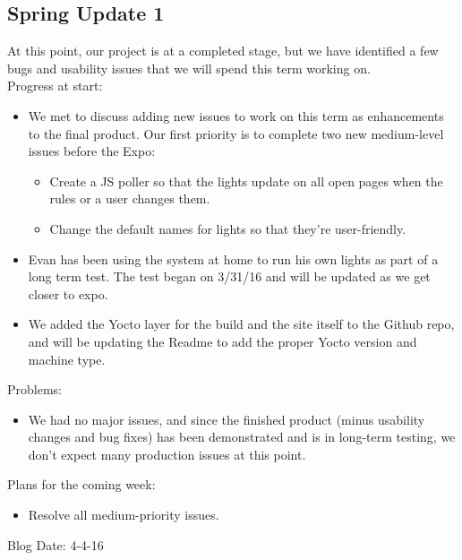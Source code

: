 \subsection{Spring Update 1}
At this point, our project is at a completed stage, but we have identified a few bugs and usability issues that we will spend this term working on.\\
Progress at start:
\begin{itemize}
\item We met to discuss adding new issues to work on this term as enhancements to the final product. Our first priority is to complete two new medium-level issues before the Expo:
\begin{itemize}
\item Create a JS poller so that the lights update on all open pages when the rules or a user changes them.
\item Change the default names for lights so that they're user-friendly.
\end{itemize}
\item Evan has been using the system at home to run his own lights as part of a long term test. The test began on 3/31/16 and will be updated as we get closer to expo.
\item We added the Yocto layer for the build and the site itself to the Github repo, and will be updating the Readme to add the proper Yocto version and machine type.
\end{itemize}
Problems:
\begin{itemize}
\item We had no major issues, and since the finished product (minus usability changes and bug fixes) has been demonstrated and is in long-term testing, we don't expect many production issues at this point.
\end{itemize}
Plans for the coming week: 
\begin{itemize}
\item Resolve all medium-priority issues.
\end{itemize}
Blog Date: 4-4-16

